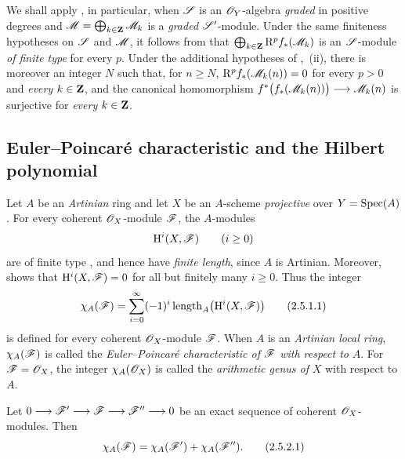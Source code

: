 \begin{env}[2.4.2]
\label{III.2.4.2}
We shall apply , in particular, when $\mathscr{S}$ is an $\mathscr{O}_Y$-algebra \emph{graded} in positive degrees and $\mathscr{M}=\bigoplus_{k\in\mathbf{Z}}\mathscr{M}_k$
is a \emph{graded} $\mathscr{S}'$-module.
Under the same finiteness hypotheses on $\mathscr{S}$ and $\mathscr{M}$, it follows from  that $\bigoplus_{k\in\mathbf{Z}}\mathrm{R}^p f_*(\mathscr{M}_k)$
is an $\mathscr{S}$-module \emph{of finite type} for every $p$.
Under the additional hypotheses of ,~(ii), there is moreover an integer $N$ such that, for $n\geq N$, $\mathrm{R}^p f_*(\mathscr{M}_k(n))=0$
for every $p>0$ and \emph{every} $k\in\mathbf{Z}$, and the canonical homomorphism $f^*\bigl(f_*(\mathscr{M}_k(n))\bigr)
\longrightarrow
\mathscr{M}_k(n)$
is surjective for \emph{every} $k\in\mathbf{Z}$.
\end{env}


\subsection{Euler--Poincar\'e characteristic and the Hilbert polynomial}
\label{subsection:III.2.5}

\begin{env}[2.5.1]
\label{III.2.5.1}
Let $A$ be an \emph{Artinian} ring and let $X$ be an $A$-scheme \emph{projective} over $Y=\operatorname{Spec}(A)$.
For every coherent $\mathscr{O}_X$-module $\mathscr{F}$, the $A$-modules
\[
  \mathrm{H}^i(X,\mathscr{F})\qquad(i\geq0)
\]
are of finite type , and hence have \emph{finite length}, since $A$ is Artinian.
Moreover,  shows that $\mathrm{H}^i(X,\mathscr{F})=0$ for all but finitely many $i\geq0$.
Thus the integer
\[
\label{III.2.5.1.1}
  \chi_A(\mathscr{F})
  =
  \sum_{i=0}^{\infty}
  (-1)^i\operatorname{length}_A\bigl(\mathrm{H}^i(X,\mathscr{F})\bigr)
  \tag{2.5.1.1}
\]
is defined for every coherent $\mathscr{O}_X$-module $\mathscr{F}$.
When $A$ is an \emph{Artinian local ring}, $\chi_A(\mathscr{F})$ is called the \emph{Euler--Poincar\'e characteristic of} $\mathscr{F}$ \emph{with respect to} $A$.
For $\mathscr{F}=\mathscr{O}_X$, the integer $\chi_A(\mathscr{O}_X)$ is called the \emph{arithmetic genus of} $X$ with respect to $A$.
\end{env}

\begin{proposition}[2.5.2]
\label{III.2.5.2}
Let $0\longrightarrow\mathscr{F}'
\longrightarrow\mathscr{F}
\longrightarrow\mathscr{F}''
\longrightarrow0$
be an exact sequence of coherent $\mathscr{O}_X$-modules.
Then
\[
\label{III.2.5.2.1}
  \chi_A(\mathscr{F})
  =
  \chi_A(\mathscr{F}')+\chi_A(\mathscr{F}'').
  \tag{2.5.2.1}
\]
\end{proposition}

